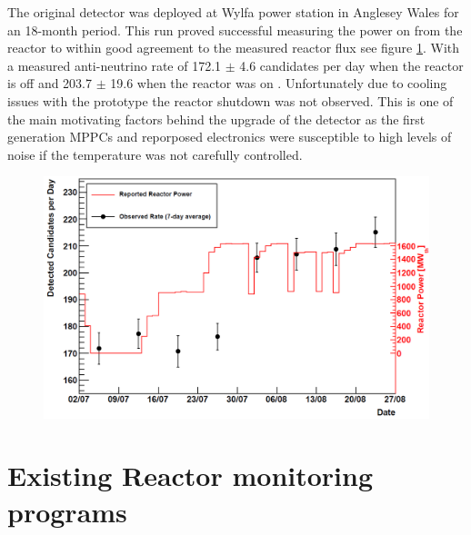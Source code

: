 The original detector was deployed at Wylfa power station in Anglesey Wales for an 18-month period. This run proved successful measuring the power on from the reactor to within good agreement to the measured reactor flux see figure \ref{fig:prototypeMeasumentFlux}. With a measured anti-neutrino rate of 172.1 $\pm$ 4.6 candidates per day when the reactor is off and 203.7 $\pm$ 19.6 when the reactor was on \cite{Carroll_2018}. Unfortunately due to cooling issues with the prototype the reactor shutdown was not observed. This is one of the main motivating factors behind the upgrade of the detector as the first generation MPPCs and reporposed electronics were susceptible to high levels of noise if the temperature was not carefully controlled. 
\begin{figure}[htbp]
 \centering
 \includegraphics[width=0.90\linewidth]{Chapter2/Figs/Raster/prototypeMeasureOnFig.png} 
 \label{fig:prototypeMeasumentFlux}
\end{figure}

\section{Existing Reactor monitoring programs}\label{sec:exisitingReactorMonitoringPrograms}
